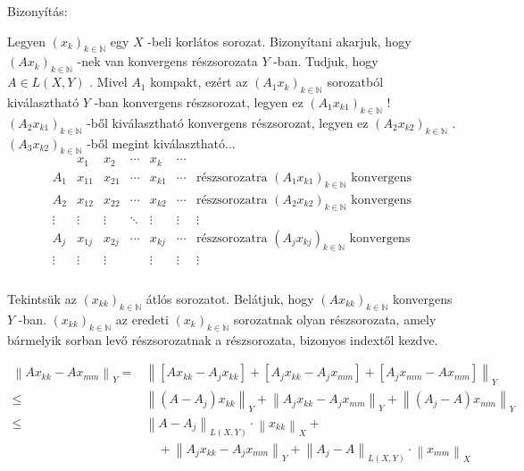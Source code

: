 \documentclass[12pt,a4paper]{scrartcl}
\newenvironment{bizonyitas}{}{}
\begin{document}
\begin{bizonyitas}

Bizonyítás:

Legyen \(\left( x_{k} \right)_{k \in {\mathbb{N}}}\) egy \(X\) -beli
korlátos sorozat. Bizonyítani akarjuk, hogy
\(\left( {Ax_{k}} \right)_{k \in {\mathbb{N}}}\) -nek van konvergens
részsorozata \(Y\) -ban. Tudjuk, hogy \(A \in L\left( {X,Y} \right)\) .
Mivel \(A_{1}\) kompakt, ezért az
\(\left( {A_{1}x_{k}} \right)_{k \in {\mathbb{N}}}\) sorozatból
kiválasztható \(Y\) -ban konvergens részsorozat, legyen ez
\(\left( {A_{1}x_{k1}} \right)_{k \in {\mathbb{N}}}\) !
\(\left( {A_{2}x_{k1}} \right)_{k \in {\mathbb{N}}}\) -ből kiválasztható
konvergens részsorozat, legyen ez
\(\left( {A_{2}x_{k2}} \right)_{k \in {\mathbb{N}}}\) .
\(\left( {A_{3}x_{k2}} \right)_{k \in {\mathbb{N}}}\) -ből megint
kiválasztható... \[\begin{array}{lllllll}
 & x_{1} & x_{2} & \cdots & x_{k} & \cdots & \\
A_{1} & x_{11} & x_{21} & \cdots & x_{k1} & \cdots & {\text{részsorozatra~}\left( {A_{1}x_{k1}} \right)_{k \in {\mathbb{N}}}\text{~konvergens}} \\
A_{2} & x_{12} & x_{22} & \cdots & x_{k2} & \cdots & {\text{részsorozatra~}\left( {A_{2}x_{k2}} \right)_{k \in {\mathbb{N}}}\text{~konvergens}} \\
 \vdots & \vdots & \vdots & \ddots & \vdots & \vdots & \vdots \\
A_{j} & x_{1j} & x_{2j} & \cdots & x_{kj} & \cdots & {\text{részsorozatra~}\left( {A_{j}x_{kj}} \right)_{k \in {\mathbb{N}}}\text{~konvergens}} \\
 \vdots & \vdots & \vdots & & \vdots & \vdots & \vdots \\
\end{array}\]\\
Tekintsük az \(\left( x_{kk} \right)_{k \in {\mathbb{N}}}\) átlós
sorozatot. Belátjuk, hogy
\(\left( {Ax_{kk}} \right)_{k \in {\mathbb{N}}}\) konvergens \(Y\) -ban.
\(\left( x_{kk} \right)_{k \in {\mathbb{N}}}\) az eredeti
\(\left( x_{k} \right)_{k \in {\mathbb{N}}}\) sorozatnak olyan
részsorozata, amely bármelyik sorban levő részsorozatnak a részsorozata,
bizonyos indextől kezdve.

\[\begin{aligned}
  {\left\| {A{x_{kk}} - A{x_{mm}}} \right\|_Y} =  & {\left\| {\left[ {A{x_{kk}} - {A_j}{x_{kk}}} \right] + \left[ {{A_j}{x_{kk}} - {A_j}{x_{mm}}} \right] + \left[ {{A_j}{x_{mm}} - A{x_{mm}}} \right]} \right\|_Y} \\ 
   \leqslant  & {\left\| {\left( {A - {A_j}} \right){x_{kk}}} \right\|_Y} + {\left\| {{A_j}{x_{kk}} - {A_j}{x_{mm}}} \right\|_Y} + {\left\| {\left( {{A_j} - A} \right){x_{mm}}} \right\|_Y} \\ 
   \leqslant  & {\left\| {A - {A_j}} \right\|_{L\left( {X,Y} \right)}} \cdot {\left\| {{x_{kk}}} \right\|_X} +  \\ 
   & \quad  + {\left\| {{A_j}{x_{kk}} - {A_j}{x_{mm}}} \right\|_Y} + {\left\| {{A_j} - A} \right\|_{L\left( {X,Y} \right)}} \cdot {\left\| {{x_{mm}}} \right\|_X} \\ 
\end{aligned} \]


\end{bizonyitas}
\end{document}
